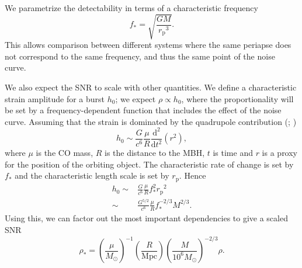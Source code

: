 \documentclass[useAMS,usedcolumn,usegraphicx,usenatbib]{mn2e}
\newcommand{\sub}[1]{\ensuremath{_\mathrm{#1}}}
\newcommand{\dd}{\ensuremath{\mathrm{d}}}
\begin{document}
We parametrize the detectability in terms of a characteristic frequency
\begin{equation}
f_\ast = \sqrt{\frac{GM}{r\sub{p}^3}}.
\end{equation}
This allows comparison between different systems where the same periapse does not correspond to the same frequency, and thus the same point of the noise curve.

We also expect the SNR to scale with other quantities. We define a characteristic strain amplitude for a burst $h_0$; we expect $\rho \propto h_0$, where the proportionality will be set by a frequency-dependent function that includes the effect of the noise curve. Assuming that the strain is dominated by the quadrupole contribution (\citealt*[section 36.10]{Misner1973}; \citealt[section 17.9]{Hobson2006})
\begin{equation}
h_0 \sim \frac{G}{c^6}\frac{\mu}{R}\frac{\dd^2}{\dd t^2}\left(r^2\right),
\end{equation}
where $\mu$ is the CO mass, $R$ is the distance to the MBH, $t$ is time and $r$ is a proxy for the position of the orbiting object. The characteristic rate of change is set by $f_\ast$ and the characteristic length scale is set by $r\sub{p}$. Hence
\begin{align}
h_0 \sim {} & \frac{G}{c^6}\frac{\mu}{R}f_\ast^2 r\sub{p}^2 \\
 \sim {} & \frac{G^{5/2}}{c^6}\frac{\mu}{R}f_\ast^{-2/3}M^{2/3}.
\end{align}
Using this, we can factor out the most important dependencies to give a scaled SNR
\begin{equation}
\rho_\ast = \left(\frac{\mu}{M_\odot}\right)^{-1}\left(\frac{R}{\mathrm{Mpc}}\right)\left(\frac{M}{10^6 M_\odot}\right)^{-2/3}\rho.
\label{eq:SNR-scaling}
\end{equation}
\end{document}
